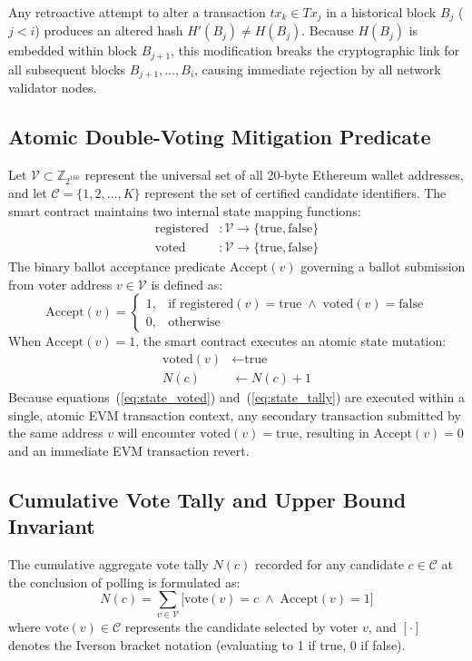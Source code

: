 \documentclass[12pt,a4paper]{report}
\begin{document}
Any retroactive attempt to alter a transaction $tx_k \in Tx_j$ in a historical block $B_j$ ($j < i$) produces an altered hash $H'(B_j) \neq H(B_j)$. Because $H(B_j)$ is embedded within block $B_{j+1}$, this modification breaks the cryptographic link for all subsequent blocks $B_{j+1}, \dots, B_i$, causing immediate rejection by all network validator nodes.

\clearpage
\subsection{Atomic Double-Voting Mitigation Predicate}
Let $\mathcal{V} \subset \mathbb{Z}_{2^{160}}$ represent the universal set of all 20-byte Ethereum wallet addresses, and let $\mathcal{C} = \{1, 2, \dots, K\}$ represent the set of certified candidate identifiers. The smart contract maintains two internal state mapping functions:
\begin{align}
    \text{registered} &: \mathcal{V} \to \{\text{true}, \text{false}\} \\
    \text{voted} &: \mathcal{V} \to \{\text{true}, \text{false}\}
\end{align}
The binary ballot acceptance predicate $\text{Accept}(v)$ governing a ballot submission from voter address $v \in \mathcal{V}$ is defined as:
\begin{equation}
    \text{Accept}(v) = \begin{cases} 
        1, & \text{if } \text{registered}(v) = \text{true} \;\land\; \text{voted}(v) = \text{false} \\ 
        0, & \text{otherwise} 
    \end{cases}
    \label{eq:double_vote}
\end{equation}
When $\text{Accept}(v) = 1$, the smart contract executes an atomic state mutation:
\begin{align}
    \text{voted}(v) &\leftarrow \text{true} \label{eq:state_voted} \\
    N(c) &\leftarrow N(c) + 1 \label{eq:state_tally}
\end{align}
Because equations~(\ref{eq:state_voted}) and~(\ref{eq:state_tally}) are executed within a single, atomic EVM transaction context, any secondary transaction submitted by the same address $v$ will encounter $\text{voted}(v) = \text{true}$, resulting in $\text{Accept}(v) = 0$ and an immediate EVM transaction revert.

\subsection{Cumulative Vote Tally and Upper Bound Invariant}
The cumulative aggregate vote tally $N(c)$ recorded for any candidate $c \in \mathcal{C}$ at the conclusion of polling is formulated as:
\begin{equation}
    N(c) = \sum_{v \in \mathcal{V}} \Big[ \text{vote}(v) = c \;\land\; \text{Accept}(v) = 1 \Big]
    \label{eq:candidate_tally}
\end{equation}
where $\text{vote}(v) \in \mathcal{C}$ represents the candidate selected by voter $v$, and $[\cdot]$ denotes the Iverson bracket notation (evaluating to 1 if true, 0 if false). 
\end{document}
